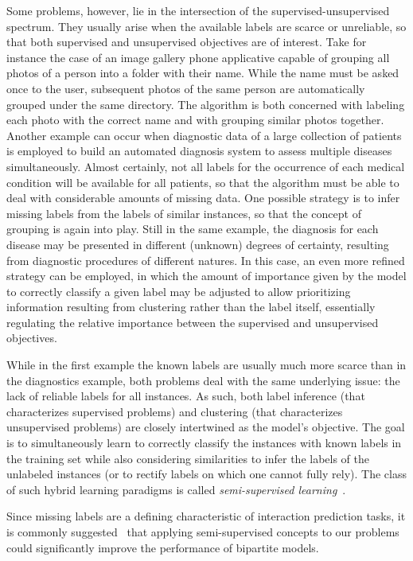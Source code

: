 Some problems, however, lie in the intersection of the supervised-unsupervised spectrum. They usually arise when the available labels are scarce or unreliable, so that both supervised and unsupervised objectives are of interest. Take for instance the case of an image gallery phone applicative capable of grouping all photos of a person into a folder with their name. While the name must be asked once to the user, subsequent photos of the same person are automatically grouped under the same directory. The algorithm is both concerned with labeling each photo with the correct name and with grouping similar photos together. Another example can occur when diagnostic data of a large collection of patients is employed to build an automated diagnosis system to assess multiple diseases simultaneously. Almost certainly, not all labels for the occurrence of each medical condition will be available for all patients, so that the algorithm must be able to deal with considerable amounts of missing data. One possible strategy is to infer missing labels from the labels of similar instances, so that the concept of grouping is again into play. Still in the same example, the diagnosis for each disease may be presented in different (unknown) degrees of certainty, resulting from diagnostic procedures of different natures. In this case, an even more refined strategy can be employed, in which the amount of importance given by the model to correctly classify a given label may be adjusted to allow prioritizing information resulting from clustering rather than the label itself, essentially regulating the relative importance between the supervised and unsupervised objectives.

While in the first example the known labels are usually much more scarce than in the diagnostics example, both problems deal with the same underlying issue: the lack of reliable labels for all instances. As such, both label inference (that characterizes supervised problems) and clustering (that characterizes unsupervised problems) are closely intertwined as the model's objective. The goal is to simultaneously learn to correctly classify the instances with known labels in the training set while also considering similarities to infer the labels of the unlabeled instances (or to rectify labels on which one cannot fully rely). The class of such hybrid learning paradigms is called \emph{semi-supervised learning}~\cite{}.

Since missing labels are a defining characteristic of interaction prediction tasks, it is commonly suggested~\cite{he2017simboost,liu2016neighborhood}  %
that applying semi-supervised concepts to our problems could significantly improve the performance of bipartite models.


